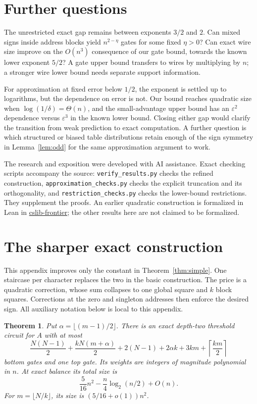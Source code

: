 \documentclass[11pt]{article}
\newtheorem{theorem}{Theorem}[section]
\begin{document}
\section{Further questions}
The unrestricted exact gap remains between exponents $3/2$ and $2$.
Can mixed signs inside address blocks yield $n^{2-\eta}$ gates for some
fixed $\eta>0$? Can exact wire size improve on the $O(n^3)$ consequence
of our gate bound, towards the known lower exponent $5/2$? A gate upper
bound transfers to wires by multiplying by $n$; a stronger wire lower
bound needs separate support information.

For approximation at fixed error below $1/2$, the exponent is settled up to logarithms,
but the dependence on error is not. Our bound reaches quadratic size
when $\log(1/\delta)=\Theta(n)$, and the small-advantage upper bound has
an $\varepsilon^2$ dependence versus $\varepsilon^3$ in the known lower
bound. Closing either gap would clarify the transition from weak
prediction to exact computation. A further question is which structured
or biased table distributions retain enough of the sign symmetry in
Lemma~\ref{lem:odd} for the same approximation argument to work.

The research and exposition were developed with AI assistance. Exact checking scripts accompany the source: \texttt{verify\_results.py}
checks the refined construction, \texttt{approximation\_checks.py} checks
the explicit truncation and its orthogonality, and
\texttt{restriction\_checks.py} checks the lower-bound restrictions.
They supplement the proofs. An earlier quadratic construction is
formalized in Lean in \href{https://github.com/cslib-community/cslib-frontier/pull/2813}{cslib-frontier};
the other results here are not claimed to be formalized.

\appendix
\section{The sharper exact construction}\label{sec:exact}
This appendix improves only the constant in Theorem~\ref{thm:simple}.
One staircase per character replaces the two in the basic construction.
The price is a quadratic correction, whose sum collapses to one global
square and $k$ block squares. Corrections at the zero and singleton
addresses then enforce the desired sign. All auxiliary notation below
is local to this appendix.
\begin{theorem}\label{thm:exact}
Put $\alpha=\lfloor(m-1)/2\rfloor$. There is an exact depth-two threshold
circuit for $A$ with at most
\begin{equation}\label{eq:bestcount}
\frac{N(N-1)}2+\frac{kN(m+\alpha)}2
 +2(N-1)+2\alpha k+3km+\left\lceil\frac{km}{2}\right\rceil
\end{equation}
bottom gates and one top gate. Its weights are integers of magnitude
polynomial in $n$. At exact balance its total size is
$$
\frac5{16}n^2-\frac n4\log_2(n/2)+O(n).
$$
For $m=\lfloor N/k\rfloor$, its size is $(5/16+o(1))n^2$.
\end{theorem}
\end{document}
